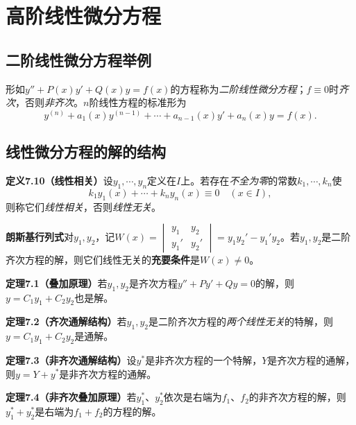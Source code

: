 

\section{高阶线性微分方程}

\subsection{二阶线性微分方程举例}

\noindent 形如$y''+P(x)y'+Q(x)y=f(x)$的方程称为\emph{二阶线性微分方程}；$f\equiv0$时\emph{齐次}，否则\emph{非齐次}。$n$阶线性方程的标准形为
\[
y^{(n)}+a_1(x)y^{(n-1)}+\cdots+a_{n-1}(x)y'+a_n(x)y=f(x).
\]

\subsection{线性微分方程的解的结构}

\noindent\textbf{定义7.10（线性相关）}\quad 设$y_1,\cdots,y_n$定义在$I$上。若存在\emph{不全为零}的常数$k_1,\cdots,k_n$使
\[
k_1y_1(x)+\cdots+k_ny_n(x)\equiv0\quad(x\in I),
\]
则称它们\emph{线性相关}，否则\emph{线性无关}。

\noindent\textbf{朗斯基行列式}\quad 对$y_1,y_2$，记$W(x)=\begin{vmatrix}y_1 & y_2\\ y_1' & y_2'\end{vmatrix}=y_1y_2'-y_1'y_2$。若$y_1,y_2$是二阶齐次方程的解，则它们线性无关的\textbf{充要条件}是$W(x)\neq0$。

\noindent\textbf{定理7.1（叠加原理）}\quad 若$y_1,y_2$是齐次方程$y''+Py'+Qy=0$的解，则$y=C_1y_1+C_2y_2$也是解。

\noindent\textbf{定理7.2（齐次通解结构）}\quad 若$y_1,y_2$是二阶齐次方程的\emph{两个线性无关}的特解，则$y=C_1y_1+C_2y_2$是通解。

\noindent\textbf{定理7.3（非齐次通解结构）}\quad 设$y^*$是非齐次方程的一个特解，$Y$是齐次方程的通解，则$y=Y+y^*$是非齐次方程的通解。

\noindent\textbf{定理7.4（非齐次叠加原理）}\quad 若$y_1^*$、$y_2^*$依次是右端为$f_1$、$f_2$的非齐次方程的解，则$y_1^*+y_2^*$是右端为$f_1+f_2$的方程的解。

